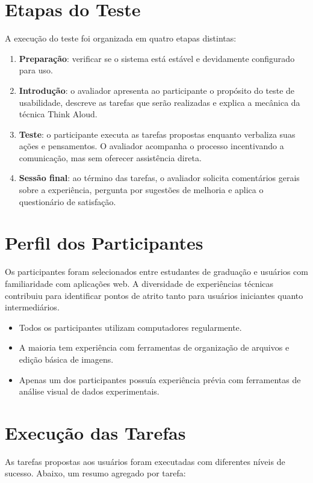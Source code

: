 \section{Etapas do Teste}
A execução do teste foi organizada em quatro etapas distintas:
\begin{enumerate}
    \item \textbf{Preparação}: verificar se o sistema está estável e devidamente configurado para uso.
    \item \textbf{Introdução}: o avaliador apresenta ao participante o propósito do teste de usabilidade, descreve as tarefas que serão realizadas e explica a mecânica da técnica Think Aloud.
    \item \textbf{Teste}: o participante executa as tarefas propostas enquanto verbaliza suas ações e pensamentos. O avaliador acompanha o processo incentivando a comunicação, mas sem oferecer assistência direta.
    \item \textbf{Sessão final}: ao término das tarefas, o avaliador solicita comentários gerais sobre a experiência, pergunta por sugestões de melhoria e aplica o questionário de satisfação.
\end{enumerate}

\section{Perfil dos Participantes}

Os participantes foram selecionados entre estudantes de graduação e usuários com familiaridade com aplicações web. A diversidade de experiências técnicas contribuiu para identificar pontos de atrito tanto para usuários iniciantes quanto intermediários.

\begin{itemize}
    \item Todos os participantes utilizam computadores regularmente.
    \item A maioria tem experiência com ferramentas de organização de arquivos e edição básica de imagens.
    \item Apenas um dos participantes possuía experiência prévia com ferramentas de análise visual de dados experimentais.
\end{itemize}

\section{Execução das Tarefas}

As tarefas propostas aos usuários foram executadas com diferentes níveis de sucesso. Abaixo, um resumo agregado por tarefa:

